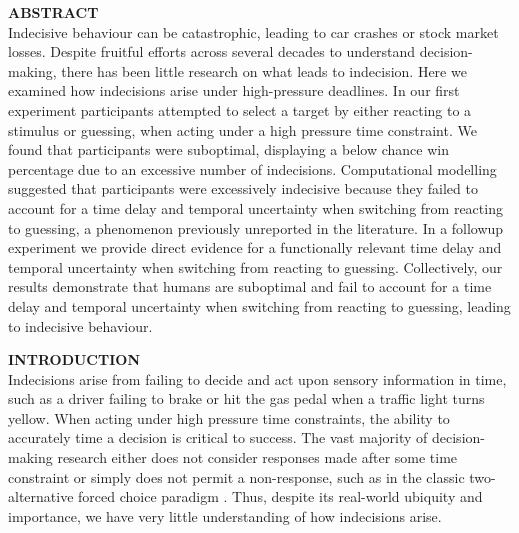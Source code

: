 \documentclass[12pt]{article}
\newcommand\boldblue[1]{\textcolor{mydarkblue}{\textbf{#1}}}
\newcommand{\SectionHeader}[1]{\noindent\boldblue{\Large{#1}}\normalsize }
\begin{document}
\newpage
\doublespace %
\linenumbers %
\SectionHeader{ABSTRACT}
\\
Indecisive behaviour can be catastrophic, leading to car crashes or stock market losses. Despite fruitful efforts across several decades to understand decision-making, there has been little research on what leads to indecision. Here we examined how indecisions arise under high-pressure deadlines. In our first experiment participants attempted to select a target by either reacting to a stimulus or guessing, when acting under a high pressure time constraint. We found that participants were suboptimal, displaying a below chance win percentage due to an excessive number of indecisions. Computational modelling suggested that participants were excessively indecisive because they failed to account for a time delay and temporal uncertainty when switching from reacting to guessing, a phenomenon previously unreported in the literature. In a followup experiment we provide direct evidence for a functionally relevant time delay and temporal uncertainty when switching from reacting to guessing. Collectively, our results demonstrate that humans are suboptimal and fail to account for a time delay and temporal uncertainty when switching from reacting to guessing, leading to indecisive behaviour.

\newpage

\pagestyle{fancy}
\fancyhead[R]{\emph{\textcolor{mydarkblue}{Indecision arises from suboptimal switching behaviour
        }}}
\fancyfoot[C]{\textcolor{mydarkblue}{\thepage}}

\vspace{2mm}
\SectionHeader{INTRODUCTION}
\vspace{2mm}
\\
\noindent Indecisions arise from failing to decide and act upon sensory information in time, such as a driver failing to brake or hit the gas pedal when a traffic light turns yellow. When acting under high pressure time constraints, the ability to accurately time a decision is critical to success. The vast majority of decision-making research either does not consider responses made after some time constraint or simply does not permit a non-response, such as in the classic two-alternative forced choice paradigm \autocite{zacksenhouseRobustOptimalStrategies2010, bogaczPhysicsOptimalDecision2006, choMechanismsUnderlyingDependencies2002, joganNewTwoalternativeForced2014, ratcliffDiffusionDecisionModel2008,ulrichThresholdEstimationTwoalternative2004,tylerSignalDetectionTheory2000}. Thus, despite its real-world ubiquity and importance, we have very little understanding of how indecisions arise.
\end{document}
